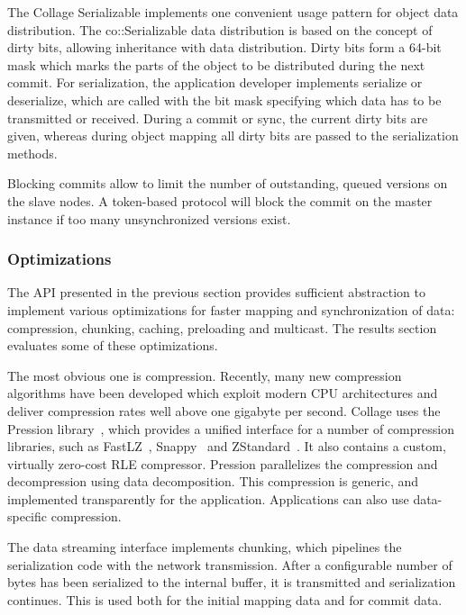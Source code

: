 \documentclass[10pt,journal,compsoc]{IEEEtran}
\begin{document}
\label{sec:Serializable}The \textsf{Collage} Serializable implements one
convenient usage pattern for object data distribution. The
\textsf{co::Serializable} data distribution is based on the concept of dirty
bits, allowing inheritance with data distribution. Dirty bits form a 64-bit mask
which marks the parts of the object to be distributed during the next commit.
For serialization, the application developer implements \textsf{serialize} or
\textsf{deserialize}, which are called with the bit mask specifying which data
has to be transmitted or received. During a commit or sync, the current dirty
bits are given, whereas during object mapping all dirty bits are passed to the
serialization methods.

Blocking commits allow to limit the number of outstanding, queued versions on
the slave nodes. A token-based protocol will block the commit on the master
instance if too many unsynchronized versions exist.

\subsubsection{Optimizations}

The API presented in the previous section provides sufficient abstraction to
implement various optimizations for faster mapping and synchronization of data:
compression, chunking, caching, preloading and multicast. The results section
evaluates some of these optimizations.

The most obvious one is compression. Recently, many new compression algorithms
have been developed which exploit modern CPU architectures and deliver
compression rates well above one gigabyte per second. \textsf{Collage} uses the
Pression library~\cite{pression}, which provides a unified interface for a
number of compression libraries, such as FastLZ~\cite{jesperfast},
Snappy~\cite{snappy} and ZStandard~\cite{zstd}. It also contains a custom,
virtually zero-cost RLE compressor. Pression parallelizes the compression and
decompression using data decomposition. This compression is generic, and
implemented transparently for the application. Applications can also use
data-specific compression.

The data streaming interface implements chunking, which pipelines the
serialization code with the network transmission. After a configurable number of
bytes has been serialized to the internal buffer, it is transmitted and
serialization continues. This is used both for the initial mapping data and for
commit data.
\end{document}
